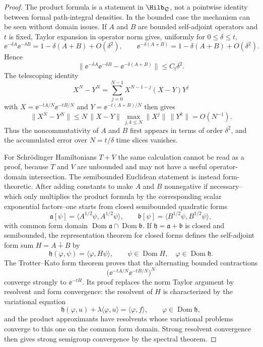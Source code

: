 \begin{proof}
The product formula is a statement in \(\Hilb_{\mathcal Q}\), not a pointwise
identity between formal path-integral densities.  In the bounded case the
mechanism can be seen without domain issues.  If \(A\) and \(B\) are bounded
self-adjoint operators and \(t\) is fixed, Taylor expansion in operator norm
gives, uniformly for \(0\le\delta\le t\),
\[
  \ee^{-\delta A}\ee^{-\delta B}
  =
  1-\delta(A+B)+O(\delta^2),
  \qquad
  \ee^{-\delta(A+B)}
  =
  1-\delta(A+B)+O(\delta^2).
\]
Hence
\[
  \bigl\|\ee^{-\delta A}\ee^{-\delta B}
  -\ee^{-\delta(A+B)}\bigr\|\le C_t\delta^2 .
\]
The telescoping identity
\[
  X^N-Y^N
  =
  \sum_{j=0}^{N-1}X^{N-1-j}(X-Y)Y^j
\]
with \(X=\ee^{-tA/N}\ee^{-tB/N}\) and
\(Y=\ee^{-t(A+B)/N}\) then gives
\[
  \|X^N-Y^N\|
  \le
  N\,\|X-Y\|\,\max_{j,k\le N}\|X^j\|\,\|Y^k\|
  =
  O(N^{-1}).
\]
Thus the noncommutativity of \(A\) and \(B\) first appears in terms of order
\(\delta^2\), and the accumulated error over \(N=t/\delta\) time slices
vanishes.

For Schr\"odinger Hamiltonians \(T+V\) the same calculation cannot be read as
a proof, because \(T\) and \(V\) are unbounded and may not have a useful
operator-domain intersection.  The semibounded Euclidean statement is instead
form-theoretic.  After adding constants to make \(A\) and \(B\) nonnegative
if necessary--which only multiplies the product formula by the corresponding
scalar exponential factors--one starts from closed semibounded quadratic forms
\[
  \mathfrak a[\psi]=\langle A^{1/2}\psi,A^{1/2}\psi\rangle,\qquad
  \mathfrak b[\psi]=\langle B^{1/2}\psi,B^{1/2}\psi\rangle ,
\]
with common form domain
\(\operatorname{Dom}\mathfrak a\cap\operatorname{Dom}\mathfrak b\).  If
\(\mathfrak h=\mathfrak a+\mathfrak b\) is closed and semibounded, the
representation theorem for closed forms defines the self-adjoint form sum
\(H=A\dotplus B\) by
\[
  \mathfrak h(\varphi,\psi)=\langle\varphi,H\psi\rangle,
  \qquad
  \psi\in\operatorname{Dom} H,\quad
  \varphi\in\operatorname{Dom}\mathfrak h .
\]
The Trotter--Kato form theorem proves that the alternating bounded
contractions
\[
  \bigl(\ee^{-tA/N}\ee^{-tB/N}\bigr)^N
\]
converge strongly to \(\ee^{-tH}\).  Its proof replaces the norm Taylor
argument by resolvent and form convergence: the resolvent of \(H\) is
characterized by the variational equation
\[
  \mathfrak h(\varphi,u)+\lambda\langle\varphi,u\rangle
  =
  \langle\varphi,f\rangle,
  \qquad
  \varphi\in\operatorname{Dom}\mathfrak h,
\]
and the product approximants have resolvents whose variational problems
converge to this one on the common form domain.  Strong resolvent convergence
then gives strong semigroup convergence by the spectral theorem.


\end{proof}
